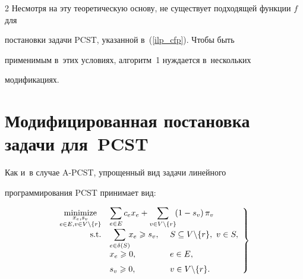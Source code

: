\begin{multicols}{2}
Несмотря на эту теоретическую основу, не существует подходящей функции $f$ для 

постановки задачи PCST, указанной в~(\ref{ilp_cfp}). Чтобы быть 

применимым в~этих условиях, алгоритм~1 нуждается в~нескольких 

модификациях.



\vspace*{-9pt}



\section{Модифицированная постановка задачи для~PCST}



\vspace*{-3pt}



Как и~в случае A-PCST, упрощенный вид задачи линейного 

программирования PCST принимает вид:

\begin{equation}

\left.

\begin{array}{rll}

\!\!\!\underset{\substack{x_e,s_v \\ e\in E, v\in V\backslash \{r\}}}{\mbox{minimize}} & 

\displaystyle \sum\limits_{e\in E}c_ex_e + \sum\limits_{v\in V\backslash\{r\}}\!\! \left(1-s_v\right)\pi_v &\\[6pt]

\!\!\!\mbox{s.t.} & \displaystyle \sum\limits_{e\in\delta(S)} \!\! x_e\geqslant s_v, & \hspace*{-22mm}S\subseteq V\backslash \{r\},~v\in S,\\[6pt]

\!\!\!& x_e\geqslant 0, & \hspace*{-22mm}e\in E,\\[6pt]

\!\!\!& s_v\geqslant 0, & \hspace*{-22mm}v\in V\backslash \{r\}.

\end{array}

\right\}

\label{rlp_pcst_inord}

\end{equation}


\end{multicols}
